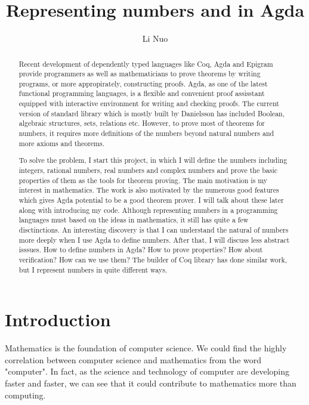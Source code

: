 \documentclass{article}
\author{Li Nuo}
\title{Representing numbers and in Agda}
\begin{document}
\maketitle
\tableofcontents

\begin{abstract}
Recent development of dependently typed languages like Coq, Agda and Epigram provide programmers as well as mathematicians to prove theorems by writing programs, or more appropirately, constructing proofs. Agda, as one
of the latest functional programming languages, is a flexible and convenient proof assisstant equipped with
interactive environment for writing and checking proofs. The current version of standard library which is mostly
built by Danielsson has included Boolean, algebraic structures, sets, relations etc. However, to prove most of
theorems for numbers, it requires more definitions of the numbers beyond natural numbers and more axioms and
theorems.

To solve the problem, I start this project, in which I will define the numbers including integers, rational numbers,
real numbers and complex numbers and prove the basic properties of them as the tools for theorem proving. The main
motivation is my interest in mathematics. The work is also motivated by the numerous good features which gives Agda potential to be a good theorem prover. I will talk about these later along with introducing my code. Although representing numbers in a programming languages must based on the ideas in mathematics, it still has quite a few
disctinctions. An interesting discovery is that I can understand the natural of numbers more deeply when I use Agda
to define numbers. After that, I will discuss less abstract isssues. How to define numbers in Agda? How to prove properties? How about verification? How can we use them? The builder of Coq library has done similar work, but I
represent numbers in quite different ways.
\end{abstract}


	
\section{Introduction}
Mathematics is the foundation of computer science. We could find the highly correlation between computer science and mathematics from the word "computer". In fact, as the science and technology of computer are developing faster and faster, we can see that it could contribute to mathematics more than computing.
\end{document}
